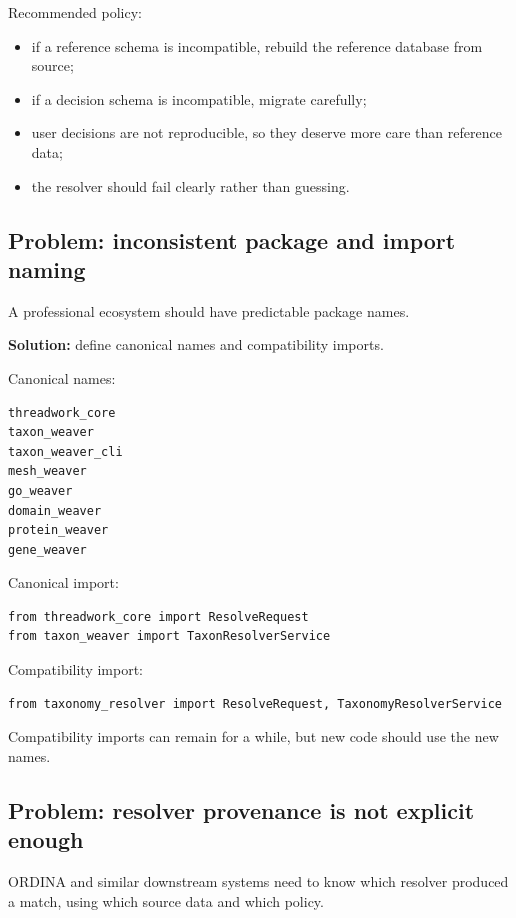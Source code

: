 \documentclass[11pt,a4paper]{article}
\begin{document}
Recommended policy:

\begin{itemize}
  \item if a reference schema is incompatible, rebuild the reference database from source;
  \item if a decision schema is incompatible, migrate carefully;
  \item user decisions are not reproducible, so they deserve more care than reference data;
  \item the resolver should fail clearly rather than guessing.
\end{itemize}

\subsection{Problem: inconsistent package and import naming}

A professional ecosystem should have predictable package names.

\textbf{Solution:} define canonical names and compatibility imports.

Canonical names:

\begin{Verbatim}[fontsize=\small]
threadwork_core
taxon_weaver
taxon_weaver_cli
mesh_weaver
go_weaver
domain_weaver
protein_weaver
gene_weaver
\end{Verbatim}

Canonical import:

\begin{Verbatim}[fontsize=\small]
from threadwork_core import ResolveRequest
from taxon_weaver import TaxonResolverService
\end{Verbatim}

Compatibility import:

\begin{Verbatim}[fontsize=\small]
from taxonomy_resolver import ResolveRequest, TaxonomyResolverService
\end{Verbatim}

Compatibility imports can remain for a while, but new code should use the new names.

\subsection{Problem: resolver provenance is not explicit enough}

ORDINA and similar downstream systems need to know which resolver produced a match, using which source data and which policy.
\end{document}
